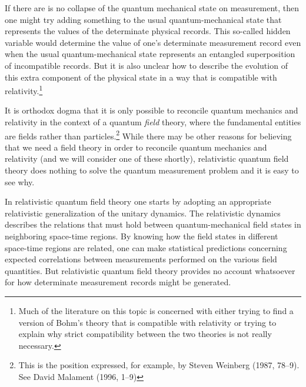 \documentclass [12pt]{article}
\begin{document}
If there are is no collapse of the quantum mechanical state on measurement,
then one might try adding something to the usual quantum-mechanical state
that represents the values of the determinate physical records.  This
so-called hidden variable would determine the value of one's
determinate measurement record even when the usual quantum-mechanical
state represents an entangled superposition of incompatible
records.  But it is also unclear how to describe the
evolution of this extra component of the physical state in a way
that is compatible with relativity.\footnote{Much of the literature on this
topic is concerned with either trying to find a version of Bohm's theory
that is compatible with relativity or trying to explain why strict
compatibility between the two theories is not really necessary.}

It is orthodox dogma that it is only possible to reconcile quantum mechanics and
relativity in the context of a quantum {\em field\/} theory, where the fundamental
entities are fields rather than particles.\footnote{This is the position expressed,
for example, by Steven Weinberg (1987, 78--9).  See David Malament (1996, 1--9)}  While
there may be other reasons for believing that we need a field theory in order
to reconcile quantum mechanics and relativity (and we will consider one
of these shortly), relativistic quantum field theory
does nothing to solve the quantum measurement problem and it is easy to see why.

In relativistic quantum field theory one starts by adopting an
appropriate relativistic generalization of the unitary dynamics.  The
relativistic dynamics describes the relations that must hold between quantum-mechanical field
states in neighboring space-time regions.  By knowing how the field states in different
space-time regions are related, one can make statistical predictions concerning
expected correlations between measurements performed on the various field quantities.
But relativistic quantum field theory provides no account whatsoever for
how determinate measurement records might be generated.
\end{document}
